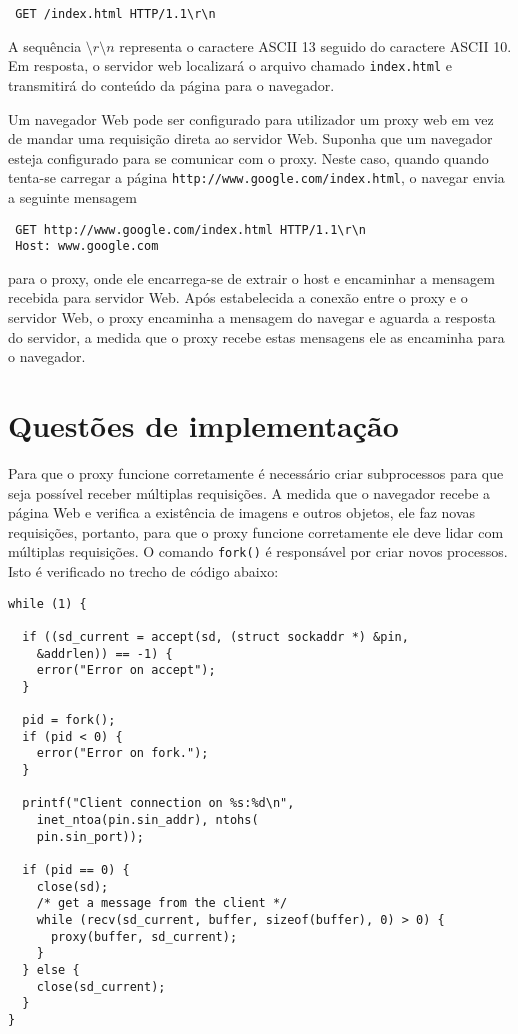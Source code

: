 \documentclass{SBCbookchapter}
\begin{document}
\begin{verbatim}
 GET /index.html HTTP/1.1\r\n
\end{verbatim}

A sequência $\setminus r\setminus n$ representa o caractere ASCII 13 seguido do caractere ASCII 10. Em resposta, o servidor web localizará o arquivo chamado {\tt index.html} e transmitirá do conteúdo da página para o navegador.

Um navegador Web pode ser configurado para utilizador um proxy web em vez de mandar uma requisição direta ao servidor Web. Suponha que um navegador esteja configurado para se comunicar com o proxy. Neste caso, quando quando tenta-se carregar a página {\tt http://www.google.com/index.html}, o navegar envia a seguinte mensagem

\begin{verbatim}
 GET http://www.google.com/index.html HTTP/1.1\r\n
 Host: www.google.com
\end{verbatim}

para o proxy, onde ele encarrega-se de extrair o host e encaminhar a mensagem recebida para servidor Web. Após estabelecida a conexão entre o proxy e o servidor Web, o proxy encaminha a mensagem do navegar e aguarda a resposta do servidor, a medida que o proxy recebe estas mensagens ele as encaminha para o navegador.

\section{Questões de implementação}
Para que o proxy funcione corretamente é necessário criar subprocessos para que seja possível receber múltiplas requisições. A medida que o navegador recebe a página Web e verifica a existência de imagens e outros objetos, ele faz novas requisições, portanto, para que o proxy funcione corretamente ele deve lidar com múltiplas requisições. O comando {\tt fork()} é responsável por criar novos processos. Isto é verificado no trecho de código abaixo:

\begin{verbatim}
while (1) {

  if ((sd_current = accept(sd, (struct sockaddr *) &pin, 
    &addrlen)) == -1) {
    error("Error on accept");
  }

  pid = fork();
  if (pid < 0) {
    error("Error on fork.");
  }

  printf("Client connection on %s:%d\n", 
    inet_ntoa(pin.sin_addr), ntohs(
    pin.sin_port));

  if (pid == 0) {
    close(sd);
    /* get a message from the client */
    while (recv(sd_current, buffer, sizeof(buffer), 0) > 0) {
      proxy(buffer, sd_current);
    }
  } else {
    close(sd_current);
  }
}
\end{verbatim}
\end{document}
